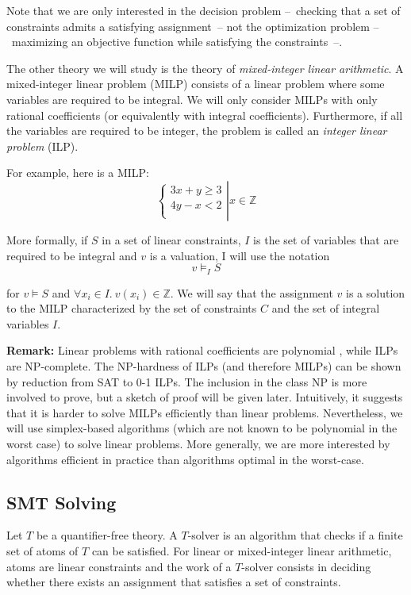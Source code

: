 \documentclass{article}
\newcommand{\ints}{\mathbb{Z}}
\begin{document}
Note that we are only interested in the decision problem --~checking
that a set of constraints admits a satisfying assignment~-- not the
optimization problem --~maximizing an objective function while
satisfying the constraints~--.

The other theory we will study is the theory of \textit{mixed-integer linear
arithmetic}. A mixed-integer linear problem (MILP) consists of a linear
problem where some variables are required to be integral. We will only consider
MILPs with only rational coefficients (or equivalently with integral
coefficients). Furthermore, if all the variables are required to be
integer, the problem is called an \textit{integer linear problem} (ILP).

For example, here is a MILP:
\begin{displaymath}
  \left\{
  \begin{array}{l}
    3x + y \geqslant 3 \\
    4y - x < 2 \\
  \end{array}
  \right|
  x \in \ints
\end{displaymath}

More formally, if $S$ in a set of linear constraints, $I$ is the set of
variables that are required to be integral and $v$ is a valuation, I will use
the notation $$v \vDash_I S$$

for $v \vDash S$
and $\forall x_i \in I.~v(x_i) \in \ints$. We will say that the assignment $v$
is a solution to the MILP characterized by the set of constraints $C$ and the
set of integral variables $I$.

\textbf{Remark:} Linear problems with rational coefficients are
polynomial \cite[Section 13, 18]{Schrijver1998}, while ILPs are NP-complete.
The NP-hardness of ILPs (and therefore MILPs)
can be shown by reduction from SAT to 0-1 ILPs. The
inclusion in the class NP is more involved to prove, but a sketch of proof will
be given later.
Intuitively, it suggests that it is harder to solve MILPs efficiently than
linear problems. Nevertheless, we will use simplex-based algorithms (which are
not known to be polynomial in the worst case) to solve linear problems. More
generally, we are more interested by algorithms efficient in practice than
algorithms optimal in the worst-case.


\subsection{SMT Solving}
\label{smt}
Let $T$ be a quantifier-free theory. A $T$-solver is an algorithm that checks
if a finite set of atoms of $T$ can be satisfied. For linear or mixed-integer
linear arithmetic, atoms are linear constraints and the work of a $T$-solver
consists in deciding whether there exists an assignment
that satisfies a set of constraints.
\end{document}
